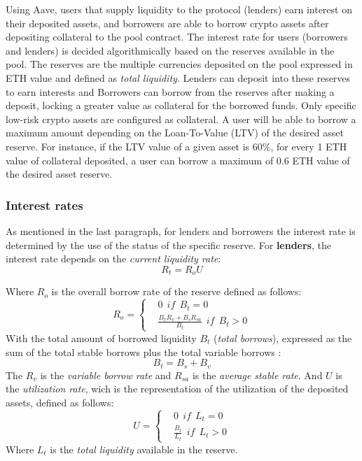 \documentclass[11pt,a4paper]{report}
\begin{document}
Using Aave, users that supply liquidity to the protocol (lenders) earn interest on their deposited assets, and borrowers are able to borrow crypto assets after depositing collateral to the pool contract. The interest rate for users (borrowers and lenders) is decided algorithmically based on the reserves available in the pool. The reserves are the multiple currencies deposited on the pool expressed in ETH value and defined as \textit{total liquidity}. Lenders can deposit into these reserves to earn interests and Borrowers can borrow from the reserves after making a deposit, locking a greater value as collateral for the borrowed funds. Only specific low-risk crypto assets are configured as collateral. A user will be able to borrow a maximum amount depending on the Loan-To-Value (LTV) of the desired asset reserve. For instance, if the LTV value of a given asset is  60\%, for every 1 ETH value of collateral deposited, a user can borrow a maximum of 0.6 ETH value of the desired asset reserve.

\subsubsection{Interest rates}
 As mentioned in the last paragraph, for lenders and borrowers the interest rate is determined by the use of the status of the specific reserve. For \textbf{lenders}, the interest rate depends on  the \textit{current liquidity rate}: \[ R_{t} = R_{o}U \]

Where $ R_{o} $ is the overall borrow rate of the reserve defined as follows:
\begin{equation}
	R_{o} = 
	\left\{\begin{matrix}
		&  0~~if~~B_{t}=0\\ 
		& \frac{B_{v}R_{v}+ B_{s}R_{sa}}{B_{t}}~~if~~B_{t} > 0
	\end{matrix}\right.
\end{equation}
With the total amount of borrowed liquidity $B_{t} $ (\textit{total borrows}), expressed as the sum of the total stable borrows plus  the total variable borrows :
\[ B_{t} = B_{s}+B_{v} \]
The $R_{v}$\cite{aaveV1RV} is the \textit{variable borrow rate} and $R_{sa}$\cite{aaveV1RS} is the \textit{average stable rate}. 
And $ U $ is the \textit{utilization rate}, wich is the representation of the utilization of the deposited assets, defined as follows:
\begin{equation}
	U = 
	\left\{\begin{matrix}
		&  0~~if~~L_{t}=0\\ 
		& \frac{B_{t}}{L_{t}}~~if~~L_{t} > 0
	\end{matrix}\right.
\end{equation}
Where $L_{t}$  is the \textit{total liquidity} available in the reserve.
\end{document}
